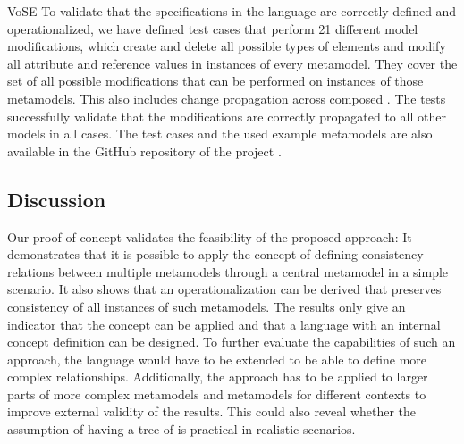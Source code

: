 \begin{copiedFrom}{VoSE}
To validate that the specifications in the \commonalities language are correctly defined and operationalized, we have
defined test cases that perform 21 different model modifications, which 
%
create and delete all possible types of elements and modify all attribute and reference values in instances of every metamodel.
They cover the set of all possible modifications that can be performed on instances of those metamodels.
This also includes change propagation across composed \commonalities.
The tests successfully validate that the modifications are correctly propagated to all other models in all cases.
The test cases and the used example metamodels are also available in the GitHub repository of the \vitruv project \cite{vitruvFrameworkGithub}. %


\subsection*{Discussion}


Our proof-of-concept validates the feasibility of the proposed \commonalities approach: 
It demonstrates that it is possible to apply the concept of defining consistency relations between multiple metamodels  through a central metamodel in a simple scenario. It also shows that an operationalization can be derived that preserves consistency of all instances of such metamodels.
The results only give an indicator that the \commonalities concept can be applied and that a language with an internal concept definition can be designed.
To further evaluate the capabilities of such an approach, the language would have to be extended to be able to define more complex relationships.
Additionally, the approach has to be applied to larger parts of more complex metamodels and metamodels for different contexts to improve external validity of the results.
This could also reveal whether the assumption of having a tree of \commonalities is practical in realistic scenarios.


\end{copiedFrom}
